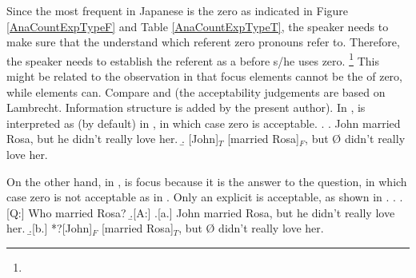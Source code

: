 Since the most frequent  in Japanese is the zero  as indicated in Figure \ref{AnaCountExpTypeF} and Table \ref{AnaCountExpTypeT},
the speaker needs to make sure that the  understand which referent zero pronouns refer to.
Therefore, the speaker needs to establish the referent as a 
before s/he uses zero.%
 \footnote{}
This might be related to the observation in  that
focus elements cannot be the  of zero,
while  elements can.
Compare \Next and \NNext (the acceptability judgements are based on Lambrecht. Information structure is added by the present author).
In \Next,  is interpreted as  (by default) in \Next[b],
in which case zero is acceptable.
%
\ex.\label{WO:TopicAppearClause-Initially:Ex:John}
 \a. John married Rosa, but he didn't really love her.
 \b. [John]$_{T}$ [married Rosa]$_{F}$, but {\O} didn't really love her.

On the other hand,
in \Next,
 is focus because it is the answer to the question,
in which case zero is not acceptable as in \Next[b].
Only an explicit  is acceptable, as shown in \Next[a].
%
\ex.\label{WO:TopicAppearClause-Initially:Ex:Rosa}
 \a.[Q:] Who married Rosa?
 \b.[A:]
   \a.[a.] John married Rosa, but he didn't really love her.
   \b.[b.] *?[John]$_{F}$ [married Rosa]$_{T}$, but {\O} didn't really love her.


